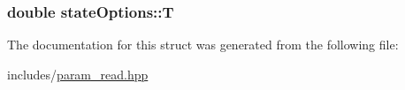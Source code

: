 \subsubsection[{\texorpdfstring{T}{T}}]{\setlength{\rightskip}{0pt plus 5cm}double state\+Options\+::T}\hypertarget{structstateOptions_a5a0e80c87ad28cdc24fc797d58dffbe7}{}\label{structstateOptions_a5a0e80c87ad28cdc24fc797d58dffbe7}


The documentation for this struct was generated from the following file\+:\begin{DoxyCompactItemize}
\item 
includes/\hyperlink{param__read_8hpp}{param\+\_\+read.\+hpp}\end{DoxyCompactItemize}
